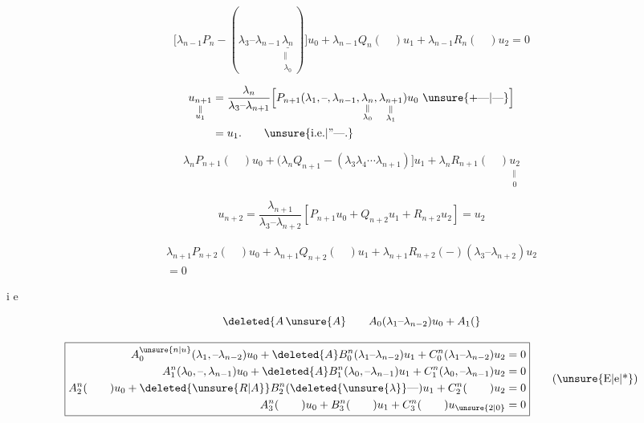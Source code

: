 {\scriptsize
\[
\boxed{\big[\lambda_{n-1}P_n-(\lambda_3\text{--}\lambda_{n-1}
\underset{\substack{\Vert\\\lambda_0}}{\underline{\lambda_n}})\big]u_0+
\lambda_{n-1}Q_n(\quad)u_1+\lambda_{n-1}R_n(\quad)u_2=0}\tag*{(1)}
\]
}

\[
\begin{aligned}
\underset{\substack{\Vert\\u_1}}{u_{n+1}}&=\frac{\lambda_n}{\lambda_3\text{--}\lambda_{n+1}}
\Big[P_{n+1}(\lambda_1,\text{--},\lambda_{n-1},\underset{\substack{\Vert\\\lambda_0}}{\lambda_n},
\underset{\substack{\Vert\\\lambda_1}}{\lambda_{n+1}})u_0\ \unsure{+\text{---}|\text{---}}\Big]\\
&=u_1.\qquad\text{\unsure{i.e.|''---.}}
\end{aligned}
\]

{\scriptsize
\[
\boxed{\lambda_nP_{n+1}(\quad)u_0+
\big(\lambda_n Q_{n+1}-(\lambda_3\lambda_4\cdots\lambda_{n+1})\big]u_1+
\lambda_n R_{n+1}(\quad)\underset{\substack{\Vert\\0}}{u_2}}\tag*{(2)}
\]
}

\[
u_{n+2}=\frac{\lambda_{n+1}}{\lambda_3\text{--}\lambda_{n+2}}
 [P_{n+1}u_0+Q_{n+2}u_1+R_{n+2}u_2]=u_2
\]

{\scriptsize
\[
\boxed{\begin{aligned}
\lambda_{n+1}P_{n+2}(\quad)u_0+\lambda_{n+1}Q_{n+2}(\quad)u_1+
\lambda_{n+1}R_{n+2}(-)(\lambda_3\text{--}\lambda_{n+2})u_2\\
=0
\end{aligned}}\tag*{(3)}
\]
}

i e

\[
\deleted{A\,\unsure{A}\qquad A_0(\lambda_1\text{--}\lambda_{n-2})u_0+A_1(}
\]

{\scriptsize
\[
\boxed{\begin{aligned}
A_0^{\unsure{n|u}}(\lambda_1,\text{--}\lambda_{n-2})u_0+
\deleted{A}B_0^n(\lambda_1\text{--}\lambda_{n-2})u_1+C_0^n(\lambda_1\text{--}\lambda_{n-2})u_2&=0\\
A_1^n(\lambda_0,\text{--},\lambda_{n-1})u_0+
\deleted{A}B_1^n(\lambda_0,\text{--}\lambda_{n-1})u_1+
C_1^n(\lambda_0,\text{--}\lambda_{n-1})u_2&=0\\
A_2^n(\qquad)u_0+\deleted{\unsure{R|A}}B_2^n(\deleted{\unsure{\lambda}}\text{---})u_1+C_2^n(\qquad)u_2&=0\\
A_3^n(\qquad)u_0+B_3^n(\qquad)u_1+C_3^n(\qquad)u_{\unsure{2|0}}&=0
\end{aligned}}\tag*{(\unsure{E|e|*})}
\]
}

